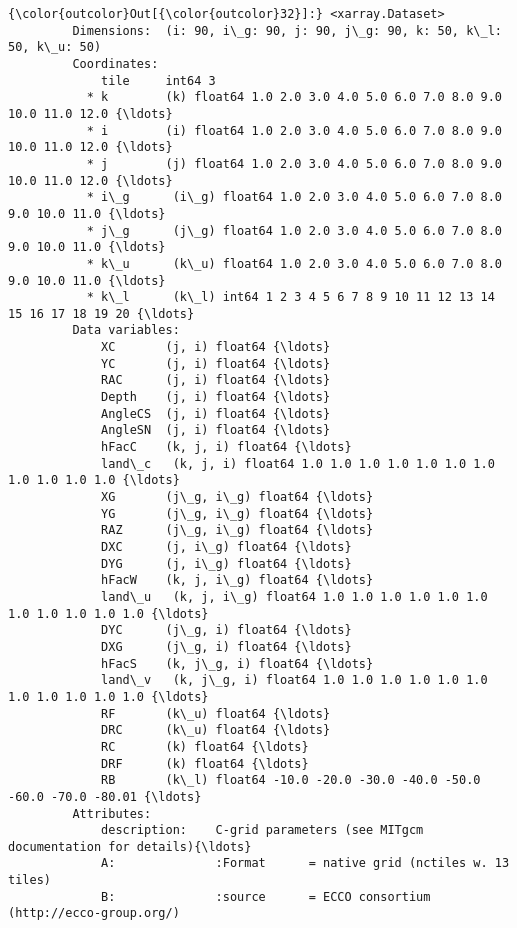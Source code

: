 \documentclass[11pt]{article}
\begin{document}
\begin{Verbatim}[commandchars=\\\{\}]
{\color{outcolor}Out[{\color{outcolor}32}]:} <xarray.Dataset>
         Dimensions:  (i: 90, i\_g: 90, j: 90, j\_g: 90, k: 50, k\_l: 50, k\_u: 50)
         Coordinates:
             tile     int64 3
           * k        (k) float64 1.0 2.0 3.0 4.0 5.0 6.0 7.0 8.0 9.0 10.0 11.0 12.0 {\ldots}
           * i        (i) float64 1.0 2.0 3.0 4.0 5.0 6.0 7.0 8.0 9.0 10.0 11.0 12.0 {\ldots}
           * j        (j) float64 1.0 2.0 3.0 4.0 5.0 6.0 7.0 8.0 9.0 10.0 11.0 12.0 {\ldots}
           * i\_g      (i\_g) float64 1.0 2.0 3.0 4.0 5.0 6.0 7.0 8.0 9.0 10.0 11.0 {\ldots}
           * j\_g      (j\_g) float64 1.0 2.0 3.0 4.0 5.0 6.0 7.0 8.0 9.0 10.0 11.0 {\ldots}
           * k\_u      (k\_u) float64 1.0 2.0 3.0 4.0 5.0 6.0 7.0 8.0 9.0 10.0 11.0 {\ldots}
           * k\_l      (k\_l) int64 1 2 3 4 5 6 7 8 9 10 11 12 13 14 15 16 17 18 19 20 {\ldots}
         Data variables:
             XC       (j, i) float64 {\ldots}
             YC       (j, i) float64 {\ldots}
             RAC      (j, i) float64 {\ldots}
             Depth    (j, i) float64 {\ldots}
             AngleCS  (j, i) float64 {\ldots}
             AngleSN  (j, i) float64 {\ldots}
             hFacC    (k, j, i) float64 {\ldots}
             land\_c   (k, j, i) float64 1.0 1.0 1.0 1.0 1.0 1.0 1.0 1.0 1.0 1.0 1.0 {\ldots}
             XG       (j\_g, i\_g) float64 {\ldots}
             YG       (j\_g, i\_g) float64 {\ldots}
             RAZ      (j\_g, i\_g) float64 {\ldots}
             DXC      (j, i\_g) float64 {\ldots}
             DYG      (j, i\_g) float64 {\ldots}
             hFacW    (k, j, i\_g) float64 {\ldots}
             land\_u   (k, j, i\_g) float64 1.0 1.0 1.0 1.0 1.0 1.0 1.0 1.0 1.0 1.0 1.0 {\ldots}
             DYC      (j\_g, i) float64 {\ldots}
             DXG      (j\_g, i) float64 {\ldots}
             hFacS    (k, j\_g, i) float64 {\ldots}
             land\_v   (k, j\_g, i) float64 1.0 1.0 1.0 1.0 1.0 1.0 1.0 1.0 1.0 1.0 1.0 {\ldots}
             RF       (k\_u) float64 {\ldots}
             DRC      (k\_u) float64 {\ldots}
             RC       (k) float64 {\ldots}
             DRF      (k) float64 {\ldots}
             RB       (k\_l) float64 -10.0 -20.0 -30.0 -40.0 -50.0 -60.0 -70.0 -80.01 {\ldots}
         Attributes:
             description:    C-grid parameters (see MITgcm documentation for details){\ldots}
             A:              :Format      = native grid (nctiles w. 13 tiles)
             B:              :source      = ECCO consortium (http://ecco-group.org/)

\end{Verbatim}
\end{document}
